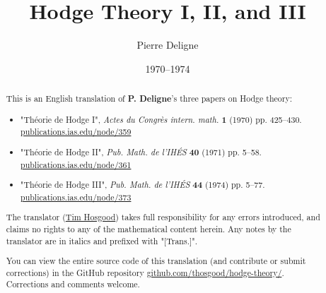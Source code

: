 \documentclass[a4paper,oneside,fleqn]{book}
\title{Hodge Theory I, II, and III}
\author{Pierre Deligne}
\date{1970--1974}
\begin{document}
\frontmatter
\pagestyle{plain}
\maketitle

\begin{abstract}
  This is an English translation of \textbf{P. Deligne}'s three papers on Hodge theory:

  \begin{itemize}
    \item
      "Théorie de Hodge I",
      \emph{Actes du Congrès intern. math.} \textbf{1} (1970) pp. 425–430.
      \\\url{publications.ias.edu/node/359}
    
    \item
      "Théorie de Hodge II",
      \emph{Pub. Math. de l'IHÉS} \textbf{40} (1971) pp. 5–58.
      \\\url{publications.ias.edu/node/361}
    
    \item
      "Théorie de Hodge III",
      \emph{Pub. Math. de l'IHÉS} \textbf{44} (1974) pp. 5–77.
      \\\url{publications.ias.edu/node/373}
    
  \end{itemize}


  The translator (\href{https://thosgood.com}{Tim Hosgood}) takes full responsibility for any errors introduced, and claims no rights to any of the mathematical content herein.
  Any notes by the translator are in italics and prefixed with "[Trans.]".
  
  You can view the entire source code of this translation (and contribute or submit corrections) in the GitHub repository \url{github.com/thosgood/hodge-theory/}.
  Corrections and comments welcome.
\end{abstract}

\setcounter{tocdepth}{1}
\tableofcontents

\mainmatter
\pagestyle{fancy}

\setcounter{chapter}{0}
\renewcommand\thepart{\Roman{part}}


\setcounter{chapter}{-1}




\backmatter
\nocite{*}
\pagestyle{plain}
\printbibliography[heading=bibintoc,title=Bibliography]
\end{document}
